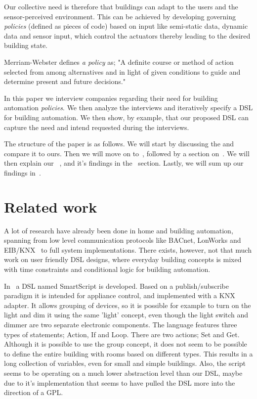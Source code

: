 \documentclass{llncs}
\begin{document}
Our collective need is therefore that buildings can adapt to the users and the sensor-perceived environment. This can be achieved by developing governing \textit{policies} (defined as pieces of code) based on input like semi-static data, dynamic data and sensor input, which control the actuators thereby leading to the desired building state.

Merriam-Webster defines \textit{a policy} as; "A definite course or method of action selected from among alternatives and in light of given conditions to guide and determine present and future decisions."

In this paper we interview companies regarding their need for building automation \textit{policies}. We then analyze the interviews and iteratively specify a DSL for building automation. We then show, by example, that our proposed DSL can capture the need and intend requested during the interviews.

The structure of the paper is as follows. We will start by discussing the and compare it to ours. Then we will move on to~, followed by a section on~. We will then explain our~ , and it's findings in the~ section. Lastly, we will sum up our findings in~.

\section{Related work}\label{sec:relatedwork}
A lot of research have already been done in home and building automation, spanning from low level communication protocols like BACnet, LonWorks and EIB/KNX~\cite{communication} to full system implementations. There exists, however, not that much work on user friendly DSL designs, where everyday building concepts is mixed with time constraints and conditional logic for building automation. 

In~\cite{smartscript} a DSL named SmartScript is developed. Based on a publish/subscribe paradigm it is intended for appliance control, and implemented with a KNX adapter. It allows grouping of devices, so it is possible for example to turn on the light and dim it using the same 'light' concept, even though the light switch and dimmer are two separate electronic components. The language features three types of statements; Action, If and Loop. There are two actions; Set and Get. Although it is possible to use the group concept, it does not seem to be possible to define the entire building with rooms based on different types. This results in a long collection of variables, even for small and simple buildings. Also, the script seems to be operating on a much lower abstraction level than our DSL, maybe due to it's implementation that seems to have pulled the DSL more into the direction of a GPL. 
\end{document}
